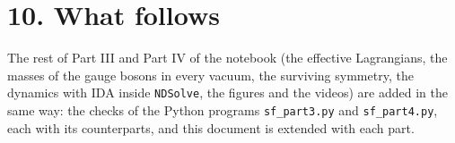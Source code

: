 \documentclass[
  10pt,
]{article}
\begin{document}
\hypertarget{what-follows}{%
\section{10. What follows}\label{what-follows}}

The rest of Part III and Part IV of the notebook (the effective
Lagrangians, the masses of the gauge bosons in every vacuum, the
surviving symmetry, the dynamics with IDA inside \texttt{NDSolve}, the
figures and the videos) are added in the same way: the checks of the
Python programs \texttt{sf\_part3.py} and \texttt{sf\_part4.py}, each
with its counterparts, and this document is extended with each part.
\end{document}
